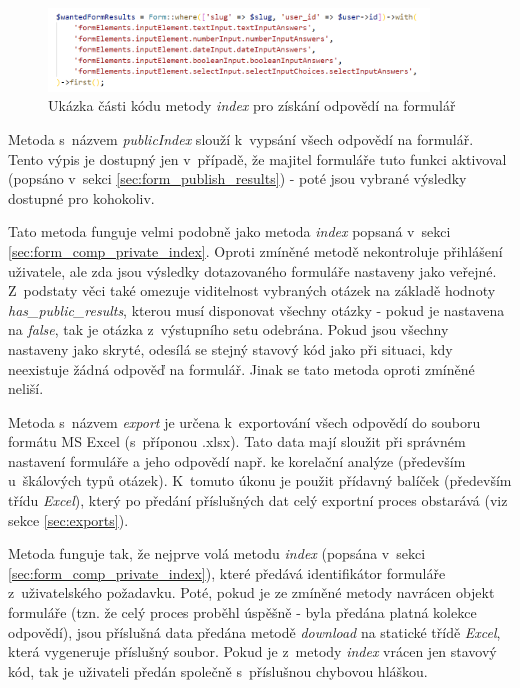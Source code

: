 			\begin{figure}[h]
				\centering
				\includegraphics[width=0.9\textwidth]{img/vraceni_vsech_vysledku.png}
				\caption{Ukázka části kódu metody \textit{index} pro získání odpovědí na formulář}
				\label{fig:vraceni_vsech_vysledku}
			\end{figure}
			
			\label{sec:form_comp_public_index}
			Metoda s~názvem \textit{publicIndex} slouží k~vypsání všech odpovědí na formulář. Tento výpis je dostupný jen v~případě, že majitel formuláře tuto funkci aktivoval (popsáno v~sekci \ref{sec:form_publish_results}) - poté jsou vybrané výsledky dostupné pro kohokoliv. 
			
			Tato metoda funguje velmi podobně jako metoda \textit{index} popsaná v~sekci \ref{sec:form_comp_private_index}. Oproti zmíněné metodě nekontroluje přihlášení uživatele, ale zda jsou výsledky dotazovaného formuláře nastaveny jako veřejné. Z~podstaty věci také omezuje viditelnost vybraných otázek na základě hodnoty \textit{has\_public\_results}, kterou musí disponovat všechny otázky - pokud je nastavena na \textit{false}, tak je otázka z~výstupního setu odebrána. Pokud jsou všechny nastaveny jako skryté, odesílá se stejný stavový kód jako při situaci, kdy neexistuje žádná odpověď na formulář. Jinak se tato metoda oproti zmíněné neliší.
			
			\label{sec:form_comp_export}
			Metoda s~názvem \textit{export} je určena k~exportování všech odpovědí do souboru formátu MS Excel (s~příponou .xlsx). Tato data mají sloužit při správném nastavení formuláře a jeho odpovědí např. ke korelační analýze (především u~škálových typů otázek). K~tomuto úkonu je použit přídavný balíček  (především třídu \textit{Excel}), který po předání příslušných dat celý exportní proces obstarává (viz sekce \ref{sec:exports}).
			
			Metoda funguje tak, že nejprve volá metodu \textit{index} (popsána v~sekci \ref{sec:form_comp_private_index}), které předává identifikátor formuláře z~uživatelského požadavku. Poté, pokud je ze zmíněné metody navrácen objekt formuláře (tzn. že celý proces proběhl úspěšně - byla předána platná kolekce odpovědí), jsou příslušná data předána metodě \textit{download} na statické třídě \textit{Excel}, která vygeneruje příslušný soubor. Pokud je z~metody \textit{index} vrácen jen stavový kód, tak je uživateli předán společně s~příslušnou chybovou hláškou.
			

